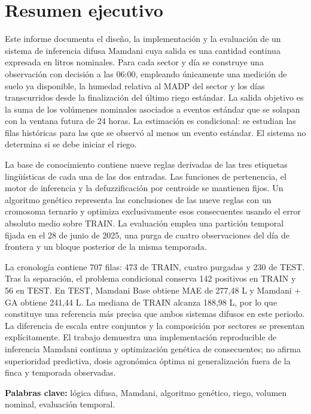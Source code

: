 \documentclass[11pt,letterpaper]{article}
\begin{document}
\section*{Resumen ejecutivo}
Este informe documenta el diseño, la implementación y la evaluación de un sistema de inferencia difusa Mamdani cuya salida es una cantidad continua expresada en litros nominales. Para cada sector y día se construye una observación con decisión a las 06:00, empleando únicamente una medición de suelo ya disponible, la humedad relativa al MADP del sector y los días transcurridos desde la finalización del último riego estándar. La salida objetivo es la suma de los volúmenes nominales asociados a eventos estándar que se solapan con la ventana futura de 24 horas. La estimación es condicional: se estudian las filas históricas para las que se observó al menos un evento estándar. El sistema no determina si se debe iniciar el riego.

La base de conocimiento contiene nueve reglas derivadas de las tres etiquetas lingüísticas de cada una de las dos entradas. Las funciones de pertenencia, el motor de inferencia y la defuzzificación por centroide se mantienen fijos. Un algoritmo genético representa las conclusiones de las nueve reglas con un cromosoma ternario y optimiza exclusivamente esos consecuentes usando el error absoluto medio sobre TRAIN. La evaluación emplea una partición temporal fijada en el 28 de junio de 2025, una purga de cuatro observaciones del día de frontera y un bloque posterior de la misma temporada.

La cronología contiene 707 filas: 473 de TRAIN, cuatro purgadas y 230 de TEST. Tras la separación, el problema condicional conserva 142 positivos en TRAIN y 56 en TEST. En TEST, Mamdani Base obtiene MAE de 277,48 L y Mamdani + GA obtiene 241,44 L. La mediana de TRAIN alcanza 188,98 L, por lo que constituye una referencia más precisa que ambos sistemas difusos en este periodo. La diferencia de escala entre conjuntos y la composición por sectores se presentan explícitamente. El trabajo demuestra una implementación reproducible de inferencia Mamdani continua y optimización genética de consecuentes; no afirma superioridad predictiva, dosis agronómica óptima ni generalización fuera de la finca y temporada observadas.

\textbf{Palabras clave:} lógica difusa, Mamdani, algoritmo genético, riego, volumen nominal, evaluación temporal.
\end{document}
